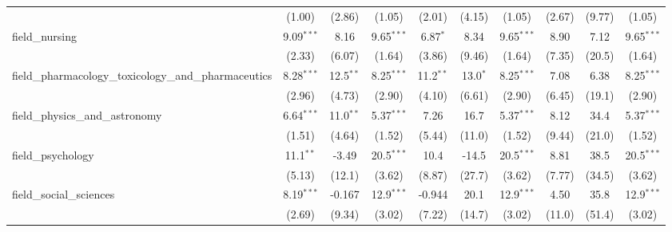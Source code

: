 \begin{tabular}{lccccccccc}
                                                               & (1.00)        & (2.86)        & (1.05)        & (2.01)       & (4.15)        & (1.05)        & (2.67)        & (9.77)         & (1.05)\\   
   field\_nursing                                              & 9.09$^{***}$  & 8.16          & 9.65$^{***}$  & 6.87$^{*}$   & 8.34          & 9.65$^{***}$  & 8.90          & 7.12           & 9.65$^{***}$\\   
                                                               & (2.33)        & (6.07)        & (1.64)        & (3.86)       & (9.46)        & (1.64)        & (7.35)        & (20.5)         & (1.64)\\   
   field\_pharmacology\_toxicology\_and\_pharmaceutics         & 8.28$^{***}$  & 12.5$^{**}$   & 8.25$^{***}$  & 11.2$^{**}$  & 13.0$^{*}$    & 8.25$^{***}$  & 7.08          & 6.38           & 8.25$^{***}$\\   
                                                               & (2.96)        & (4.73)        & (2.90)        & (4.10)       & (6.61)        & (2.90)        & (6.45)        & (19.1)         & (2.90)\\   
   field\_physics\_and\_astronomy                              & 6.64$^{***}$  & 11.0$^{**}$   & 5.37$^{***}$  & 7.26         & 16.7          & 5.37$^{***}$  & 8.12          & 34.4           & 5.37$^{***}$\\   
                                                               & (1.51)        & (4.64)        & (1.52)        & (5.44)       & (11.0)        & (1.52)        & (9.44)        & (21.0)         & (1.52)\\   
   field\_psychology                                           & 11.1$^{**}$   & -3.49         & 20.5$^{***}$  & 10.4         & -14.5         & 20.5$^{***}$  & 8.81          & 38.5           & 20.5$^{***}$\\   
                                                               & (5.13)        & (12.1)        & (3.62)        & (8.87)       & (27.7)        & (3.62)        & (7.77)        & (34.5)         & (3.62)\\   
   field\_social\_sciences                                     & 8.19$^{***}$  & -0.167        & 12.9$^{***}$  & -0.944       & 20.1          & 12.9$^{***}$  & 4.50          & 35.8           & 12.9$^{***}$\\   
                                                               & (2.69)        & (9.34)        & (3.02)        & (7.22)       & (14.7)        & (3.02)        & (11.0)        & (51.4)         & (3.02)\\   

\end{tabular}
